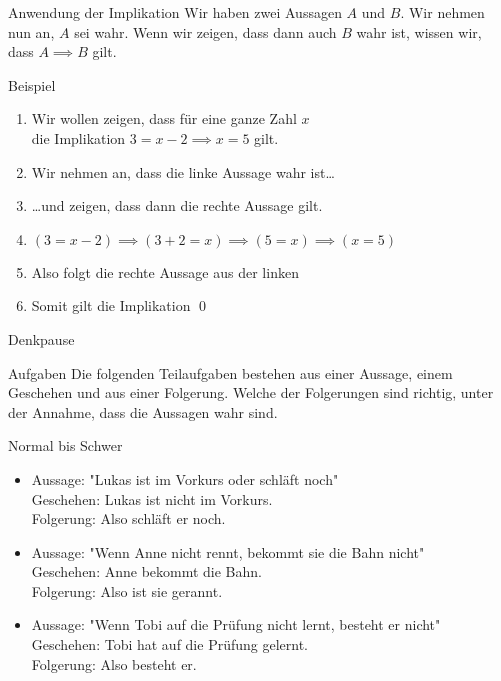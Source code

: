 \begin{frame}{Anwendung der Implikation}
    Wir haben zwei Aussagen $A$ und $B$. Wir nehmen nun an, $A$ sei wahr. Wenn wir zeigen, dass dann auch $B$ wahr ist, wissen wir, dass $A \implies B$ gilt.
\begin{exampleblock}{Beispiel}
\begin{enumerate}
    \item<1-> Wir wollen zeigen, dass für eine ganze Zahl $x$ \\
    die Implikation $3 = x - 2 \implies x = 5$ gilt.
    \item<2-> Wir nehmen an, dass die linke Aussage wahr ist\dots
    \item<3-> \dots und zeigen, dass dann die rechte Aussage gilt.
    \item<4-> $(3 = x - 2) \implies (3 + 2 = x) \implies (5 = x) \implies (x = 5)$
    \item<5-> Also folgt die rechte Aussage aus der linken
    \item<6-> Somit gilt die Implikation \qed\;
\end{enumerate}
\end{exampleblock}
\end{frame}

{
\begin{frame}{Denkpause}
    \begin{alertblock}{Aufgaben}
      Die folgenden Teilaufgaben bestehen aus einer Aussage, einem Geschehen und aus einer Folgerung. Welche der Folgerungen sind richtig, unter der Annahme, 
      dass die Aussagen wahr sind.
    \end{alertblock}
    \begin{block}{Normal bis Schwer}
    \begin{itemize}
        \item Aussage: "Lukas ist im Vorkurs oder schläft noch"\\
        Geschehen: Lukas ist nicht im Vorkurs.\\
        Folgerung: Also schläft er noch.
        \item Aussage: "Wenn Anne nicht rennt, bekommt sie die Bahn nicht"\\
        Geschehen: Anne bekommt die Bahn.\\
        Folgerung: Also ist sie gerannt.
        \item Aussage: "Wenn Tobi auf die Prüfung nicht lernt, besteht er nicht"\\
        Geschehen: Tobi hat auf die Prüfung gelernt.\\
        Folgerung: Also besteht er.
    \end{itemize}
    \end{block}
\end{frame}
}

